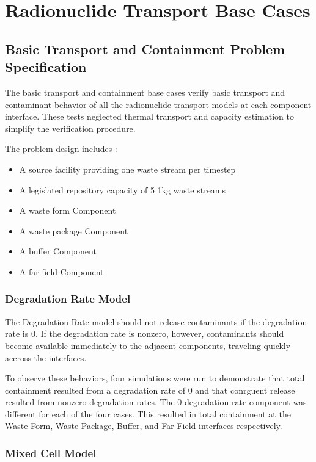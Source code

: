 \section{Radionuclide Transport Base Cases}\label{sec:nuclide_base_cases}
\subsection{Basic Transport and Containment Problem Specification}
The basic transport and containment base cases verify basic transport and 
contaminant behavior of all the radionuclide transport models at each component 
interface. These tests neglected thermal transport and capacity estimation to 
simplify the verification procedure. 

The problem design includes : 
\begin{itemize}
\item{A source facility providing one waste stream per timestep}
\item{A legislated repository capacity of 5 1kg waste streams}
\item{A waste form Component} 
\item{A waste package Component}
\item{A buffer Component}
\item{A far field Component}
\end{itemize}

\subsubsection{Degradation Rate Model}
The Degradation Rate model should not release contaminants if the degradation 
rate is 0. If the degradation rate is nonzero, however, contaminants should 
become available immediately to the adjacent components, traveling quickly 
accross the interfaces. 

To observe these behaviors, four simulations were run to demonstrate that total 
containment resulted from a degradation rate of 0 and that conrguent release 
resulted from nonzero degradation rates. The 0 degradation rate component was 
different for each of the four cases. This resulted in total containment at the 
Waste Form, Waste Package, Buffer, and Far Field interfaces respectively. 



\clearpage

\subsubsection{Mixed Cell Model}

